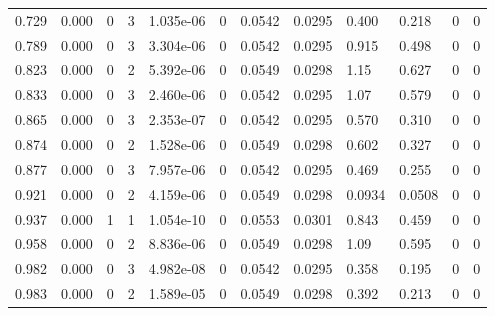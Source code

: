 \documentclass[preview]{standalone}
\begin{document}
{{\begin{tabular}{L{1.2cm}C{1.2cm} C{0.3cm}C{0.5cm} C{1.4cm}C{1.4cm} C{1.4cm}C{1.4cm} C{1.6cm}C{1.6cm} C{1.6cm}C{1.6cm}}
  0.729  &  0.000  & 0     &  3 &  1.035e-06  & 0  &  0.0542&   0.0295& 0.400 & 0.218   &  0 & 0  \\ 
  0.789  &  0.000  & 0     &  3 &  3.304e-06  & 0  &  0.0542&   0.0295& 0.915 & 0.498   &  0 & 0  \\ 
  0.823  &  0.000  & 0     &  2 &  5.392e-06  & 0  &  0.0549&   0.0298& 1.15 & 0.627   &  0 & 0  \\ 
  0.833  &  0.000  & 0     &  3 &  2.460e-06  & 0  &  0.0542&   0.0295& 1.07 & 0.579   &  0 & 0  \\ 
  0.865  &  0.000  & 0     &  3 &  2.353e-07  & 0  &  0.0542&   0.0295& 0.570 & 0.310   &  0 & 0  \\ 
  0.874  &  0.000  & 0     &  2 &  1.528e-06  & 0  &  0.0549&   0.0298& 0.602 & 0.327   &  0 & 0  \\ 
  0.877  &  0.000  & 0     &  3 &  7.957e-06  & 0  &  0.0542&   0.0295& 0.469 & 0.255   &  0 & 0  \\ 
  0.921  &  0.000  & 0     &  2 &  4.159e-06  & 0  &  0.0549&   0.0298& 0.0934 & 0.0508   &  0 & 0  \\ 
  0.937  &  0.000  & 1     &  1 &  1.054e-10  & 0  &  0.0553&   0.0301& 0.843 & 0.459   &  0 & 0  \\ 
  0.958  &  0.000  & 0     &  2 &  8.836e-06  & 0  &  0.0549&   0.0298& 1.09 & 0.595   &  0 & 0  \\ 
  0.982  &  0.000  & 0     &  3 &  4.982e-08  & 0  &  0.0542&   0.0295& 0.358 & 0.195   &  0 & 0  \\ 
  0.983  &  0.000  & 0     &  2 &  1.589e-05  & 0  &  0.0549&   0.0298& 0.392 & 0.213   &  0 & 0  \\ 
\hline 
\end{tabular} 

}}
\end{document}

